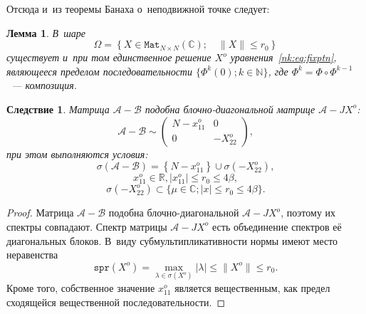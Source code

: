 \documentclass[14pt,a4paper]{extarticle}
\numberwithin{equation}{section}
\newtheorem{lem}{Лемма}
\newtheorem{crl}{Следствие}
\theoremstyle{definition}
\begin{document}
Отсюда и~из теоремы Банаха о~неподвижной точке следует:
\begin{lem}
В~шаре \[ \Omega = \left\{ X\in\mathtt{Mat}_{N{\times}N}(\mathbb{C}); \quad \|X\| \leq r_0 \right\} \]
    существует и~при том единственное решение \( X^o \) уравнения~\eqref{nk:eq:fixptn},
    являющееся пределом последовательности \( \{ \Phi^k(0); k\in\mathbb{N} \} \),
    где \( \Phi^k = \Phi\circ\Phi^{k-1} \)~--- композиция.
\end{lem}

\begin{crl}
Матрица \( \mathcal{A} - \mathcal{B} \) подобна блочно-диагональной матрице \( \mathcal{A} - J X^o \):
\[ \mathcal{A} - \mathcal{B} \sim
\begin{pmatrix}
N - x_{11}^o & 0 \\
0 & -X_{22}^o
\end{pmatrix}, \]
при этом выполняются условия:
\[ \sigma\left(\mathcal{A} - \mathcal{B}\right) = \left\{N-x_{11}^o\right\}\cup \sigma\left(-X_{22}^o\right), \]
    \[ x_{11}^o\in\mathbb{R}, \lvert x_{11}^o \rvert \leq r_0 \leq 4\beta, \]
\[ \sigma\left(-X_{22}^o\right) \subset \{ \mu\in\mathbb{C}; \lvert x \rvert \leq r_0 \leq 4\beta \}. \]
\end{crl}
\begin{proof}
    Матрица \( \mathcal{A} - \mathcal{B} \) подобна блочно-диагональной \( \mathcal{A} - J X^o \),
    поэтому их спектры совпадают.
    Спектр матрицы \( \mathcal{A} - J X^o \) есть объединение спектров е\"е диагональных блоков.
    В~виду субмультипликативности нормы имеют место неравенства
    \[ \mathtt{spr}(X^o) = \max_{\lambda\in\sigma(X^o)}\lvert\lambda\rvert \leq \|X^o\| \leq r_0. \]
    Кроме того, собственное значение \( x_{11}^o \) является вещественным, как предел сходящейся вещественной последовательности.
\end{proof}
\end{document}
